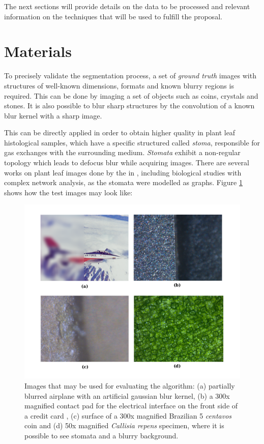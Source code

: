 The next sections will provide details on the data to be processed and relevant information on the techniques that will be used to fulfill the proposal.

\section{Materials}

To precisely validate the segmentation process, a set of \emph{ground truth} images with structures of well-known dimensions, formats and known blurry regions is required. This can be done by imaging a set of objects such as coins, crystals and stones. It is also possible to blur sharp structures by the convolution of a known blur kernel with a sharp image. 

This can be directly applied in order to obtain higher quality in plant leaf histological samples, which have a specific structured called \emph{stoma}, responsible for gas exchanges with the surrounding medium. \emph{Stomata} exhibit a non-regular topology which leads to defocus blur while acquiring images. There are several works on plant leaf images done by the   in , including biological studies with complex network analysis, as the stomata were modelled as graphs. Figure \ref{fig:validation_images} shows how the test images may look like:

\begin{figure}[htb]
	\centering
	\caption{\label{fig:validation_images}Images that may be used for evaluating the algorithm: (a) partially blurred airplane with an artificial gaussian blur kernel, (b) a 300x magnified contact pad for the electrical interface on the front side of a credit card , (c) surface of a 300x magnified Brazilian 5 \emph{centavos} coin and (d) 50x magnified \textit{Callisia repens} specimen, where it is possible to see stomata and a blurry background.}
	\begin{center}
	    \includegraphics[scale=0.35]{images/fig13.png}
	\end{center}
	\centering
    \fautor
\end{figure}

